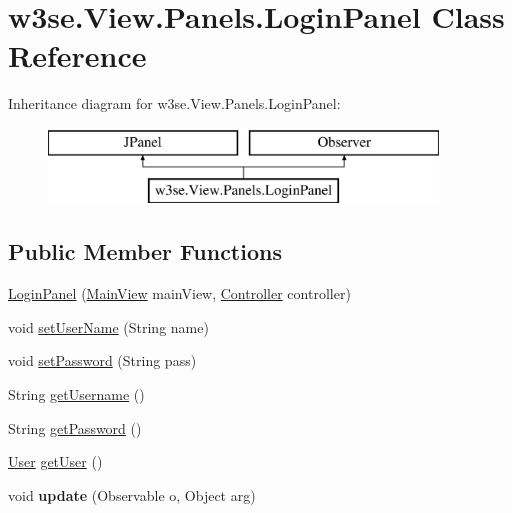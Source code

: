 \hypertarget{classw3se_1_1_view_1_1_panels_1_1_login_panel}{\section{w3se.\-View.\-Panels.\-Login\-Panel Class Reference}
\label{classw3se_1_1_view_1_1_panels_1_1_login_panel}
}
Inheritance diagram for w3se.\-View.\-Panels.\-Login\-Panel\-:\begin{figure}[H]
\begin{center}
\leavevmode
\includegraphics[height=2.000000cm]{classw3se_1_1_view_1_1_panels_1_1_login_panel}
\end{center}
\end{figure}
\subsection*{Public Member Functions}
\begin{DoxyCompactItemize}
\item 
\hyperlink{classw3se_1_1_view_1_1_panels_1_1_login_panel_a8eaf0243ffff23a995975172d6950740}{Login\-Panel} (\hyperlink{classw3se_1_1_view_1_1_main_view}{Main\-View} main\-View, \hyperlink{interfacew3se_1_1_controller_1_1_controller}{Controller} controller)
\item 
void \hyperlink{classw3se_1_1_view_1_1_panels_1_1_login_panel_a6173b7021b7ff12d2929c0f57a385d0c}{set\-User\-Name} (String name)
\item 
void \hyperlink{classw3se_1_1_view_1_1_panels_1_1_login_panel_a2a890cfc80c11c9caaf4bac95529b061}{set\-Password} (String pass)
\item 
String \hyperlink{classw3se_1_1_view_1_1_panels_1_1_login_panel_a34073c2bdca9bee6a8d08e8b07ee6d1a}{get\-Username} ()
\item 
String \hyperlink{classw3se_1_1_view_1_1_panels_1_1_login_panel_ab6c674acfab22634c8b5c93ad57cfad4}{get\-Password} ()
\item 
\hyperlink{classw3se_1_1_model_1_1_base_1_1_user}{User} \hyperlink{classw3se_1_1_view_1_1_panels_1_1_login_panel_a7ce98234c43151c78df4df4b723277f1}{get\-User} ()
\item 
\hypertarget{classw3se_1_1_view_1_1_panels_1_1_login_panel_a2f55a84984d796222258329f822d354d}{void {\bfseries update} (Observable o, Object arg)}\label{classw3se_1_1_view_1_1_panels_1_1_login_panel_a2f55a84984d796222258329f822d354d}

\end{DoxyCompactItemize}


